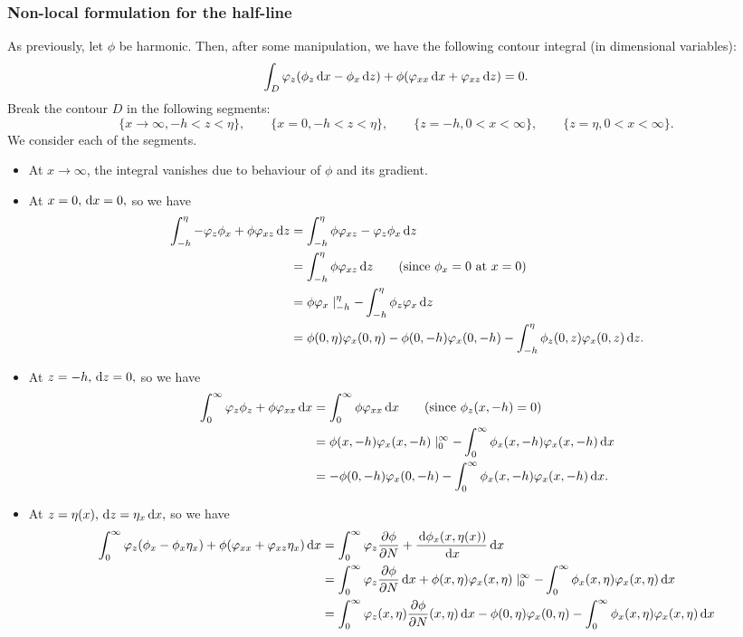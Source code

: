 \documentclass[10pt,reqno,oneside,a4paper]{article}
\begin{document}
\subsubsection{Non-local formulation for the half-line}
As previously, let $\phi$ be harmonic. Then, after some manipulation, we have the following contour integral (in dimensional variables):
\begin{equation}\label{contourHL}
\int_D \varphi_z(\phi_z \,\mathrm{d} x - \phi_x \,\mathrm{d} z) + \phi(\varphi_{xx} \,\mathrm{d} x + \varphi_{xz} \,\mathrm{d} z) = 0.
\end{equation}
Break the contour $D$ in the following segments:
\[ 
\{ x \to \infty, -h < z < \eta\}, \qquad \{ x = 0, -h < z < \eta\}, \qquad \{ z = -h, 0<x<\infty\}, \qquad \{ z = \eta, 0<x<\infty\}.
\]
We consider each of the segments.
\begin{itemize}
\item At $x \to \infty$, the integral vanishes due to behaviour of $\phi$ and its gradient. 
\item At $x = 0, \,\mathrm{d} x = 0,$ so we have 
\begin{align*}
\int_{-h}^{\eta} - \varphi_z \phi_x + \phi \varphi_{xz} \,\mathrm{d} z &= \int_{-h}^{\eta} \phi \varphi_{xz} - \varphi_z \phi_x  \,\mathrm{d} z \\
&= \int_{-h}^{\eta} \phi \varphi_{xz} \,\mathrm{d} z \qquad \text{(since $\phi_x = 0$ at $x = 0$)} \\
&= \phi \varphi_x \mid^{\eta}_{-h} - \int_{-h}^{\eta} \phi_{z} \varphi_{x} \,\mathrm{d} z \\
&= \phi(0, \eta) \varphi_x(0, \eta) - \phi(0, -h) \varphi_x(0, -h) - \int_{-h}^{\eta} \phi_{z}(0,z) \varphi_{x}(0,z) \,\mathrm{d} z. 
\end{align*} 
\item At $z = -h, \,\mathrm{d} z = 0,$ so we have 
\begin{align*}
\int^{\infty}_{0} \varphi_z \phi_z + \phi \varphi_{xx} \,\mathrm{d} x &= \int^{\infty}_{0} \phi \varphi_{xx} \,\mathrm{d} x \qquad \text{(since $\phi_{z}(x,-h) = 0$)}\\
&= \phi(x,-h) \varphi_{x}(x,-h) \mid^{\infty}_{0} - \int^{\infty}_{0} \phi_x(x,-h) \varphi_x(x,-h) \,\mathrm{d} x \\
&= - \phi(0,-h) \varphi_{x}(0,-h) - \int^{\infty}_{0} \phi_x(x,-h) \varphi_x(x,-h) \,\mathrm{d} x.
\end{align*}
\item At $z = \eta(x), \,\mathrm{d} z = \eta_x \,\mathrm{d} x,$ so we have
\begin{align*}
\int_{0}^{\infty} \varphi_z(\phi_x - \phi_x \eta_x) + \phi(\varphi_{xx}  + \varphi_{xz}\eta_x) \,\mathrm{d} x &= \int_{0}^{\infty} \varphi_z \frac{\partial \phi}{\partial N}+ \frac{\,\mathrm{d} \phi_x(x, \eta(x))}{\,\mathrm{d} x} \,\mathrm{d} x \\
&= \int_{0}^{\infty} \varphi_z\frac{\partial \phi}{\partial N}\,\mathrm{d} x + \phi(x, \eta) \varphi_x(x, \eta) \mid^{\infty}_{0} - \int^{\infty}_{0}\phi_x(x, \eta)  \varphi_x(x, \eta) \,\mathrm{d} x \\
&= \int_{0}^{\infty} \varphi_z(x, \eta)\frac{\partial \phi}{\partial N}(x, \eta)\,\mathrm{d} x - \phi(0, \eta) \varphi_x(0, \eta) - \int^{\infty}_{0}\phi_x(x, \eta)  \varphi_x(x, \eta) \,\mathrm{d} x
\end{align*}
 \end{itemize}
\end{document}
